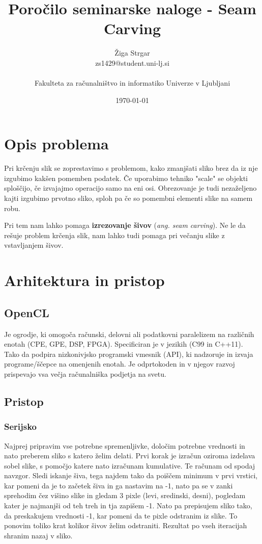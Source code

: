 \documentclass[11pt,a4paper]{article}
\title{Poročilo seminarske naloge - Seam Carving}
\author{Žiga Strgar\\
zs1429@student.uni-lj.si\\
\ \\
Fakulteta za računalništvo in informatiko Univerze v Ljubljani
\date{\today}
}
\begin{document}
\maketitle

\section{Opis problema}

Pri krčenju slik se zoprestavimo s problemom, kako zmanjšati sliko brez da iz
nje izgubimo kakšen pomemben podatek. Če uporabimo tehniko "scale" se objekti
sploščijo, če izvajajmo operacijo samo na eni osi. Obrezovanje je tudi nezaželjeno
kajti izgubimo prvotno sliko, sploh pa če so pomembni elementi slike na samem robu.

Pri tem nam lahko pomaga \textbf{izrezovanje šivov} (\emph{ang. seam carving}).
Ne le da rešuje problem krčenja slik, nam lahko tudi pomaga pri večanju slike z
vstavljanjem šivov.

\section{Arhitektura in pristop}

\subsection{OpenCL}

Je ogrodje, ki omogoča računski, delovni ali podatkovni paralelizem na različnih
enotah (CPE, GPE, DSP, FPGA). Specificiran je v jezikih (C99 in C++11). Tako da
podpira nizkonivjsko programski vmesnik (API), ki nadzoruje in izvaja programe/ščepce
na omenjenih enotah. Je odprtokoden in v njegov razvoj prispevajo vsa večja
računalniška podjetja na svetu.

\subsection{Pristop}

\subsubsection{Serijsko}

Najprej pripravim vse potrebne spremenljivke, določim potrebne vrednosti in nato
preberem sliko s katero želim delati. Prvi korak je izračun oziroma izdelava
sobel slike, s pomočjo katere nato izračunam kumulative. Te računam od spodaj
navzgor. Sledi iskanje šiva, tega najdem tako da poiščem minimum v prvi vrstici,
kar pomeni da je to začetek šiva in ga nastavim na -1, nato pa se v zanki
 sprehodim čez višino slike in gledam 3 pixle (levi, sredinski, desni),
 pogledam kater je najmanjši od teh treh in tja zapišem -1. Nato pa prepisujem
 sliko tako, da preskakujem vrednosti -1, kar pomeni da te pixle odstranim
 iz slike. To ponovim toliko krat kolikor šivov želim odstraniti. Rezultat po
 vseh iteracijah shranim nazaj v sliko.
\end{document}

